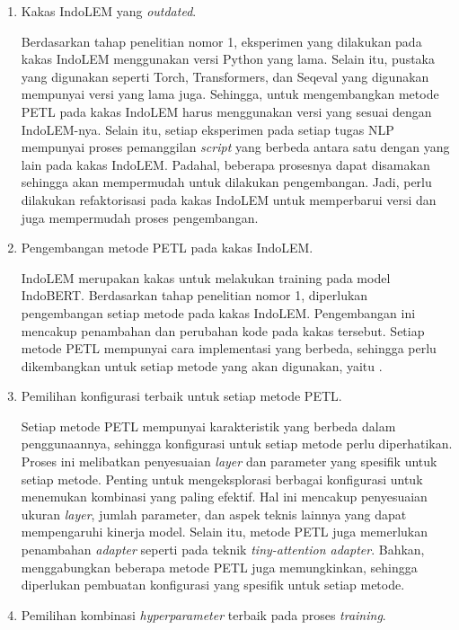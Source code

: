 \begin{enumerate}
    \item Kakas IndoLEM yang \textit{outdated}.
    
    Berdasarkan tahap penelitian nomor 1, eksperimen yang dilakukan pada kakas IndoLEM menggunakan versi Python yang lama. Selain itu, pustaka yang digunakan seperti Torch, Transformers, dan Seqeval yang digunakan mempunyai versi yang lama juga. Sehingga, untuk mengembangkan metode PETL pada kakas IndoLEM harus menggunakan versi yang sesuai dengan IndoLEM-nya. Selain itu, setiap eksperimen pada setiap tugas NLP mempunyai proses pemanggilan \textit{script} yang berbeda antara satu dengan yang lain pada kakas IndoLEM. Padahal, beberapa prosesnya dapat disamakan sehingga akan mempermudah untuk dilakukan pengembangan. Jadi, perlu dilakukan refaktorisasi pada kakas IndoLEM untuk memperbarui versi dan juga mempermudah proses pengembangan. 

    \item Pengembangan metode PETL pada kakas IndoLEM.
    
    IndoLEM merupakan kakas untuk melakukan training pada model IndoBERT. Berdasarkan tahap penelitian nomor 1, diperlukan pengembangan setiap metode pada kakas IndoLEM. Pengembangan ini mencakup penambahan dan perubahan kode pada kakas tersebut. Setiap metode PETL mempunyai cara implementasi yang berbeda, sehingga perlu dikembangkan untuk setiap metode yang akan digunakan, yaitu \methodPETL.

    \item Pemilihan konfigurasi terbaik untuk setiap metode PETL.
    
    Setiap metode PETL mempunyai karakteristik yang berbeda dalam penggunaannya, sehingga konfigurasi untuk setiap metode perlu diperhatikan. Proses ini melibatkan penyesuaian \textit{layer} dan parameter yang spesifik untuk setiap metode. Penting untuk mengeksplorasi berbagai konfigurasi untuk menemukan kombinasi yang paling efektif. Hal ini mencakup penyesuaian ukuran \textit{layer}, jumlah parameter, dan aspek teknis lainnya yang dapat mempengaruhi kinerja model. Selain itu, metode PETL juga memerlukan penambahan \textit{adapter} seperti pada teknik \textit{tiny-attention adapter}. Bahkan, menggabungkan beberapa metode PETL juga memungkinkan, sehingga diperlukan pembuatan konfigurasi yang spesifik untuk setiap metode.

    \item Pemilihan kombinasi \textit{hyperparameter} terbaik pada proses \textit{training}.
    

\end{enumerate}

